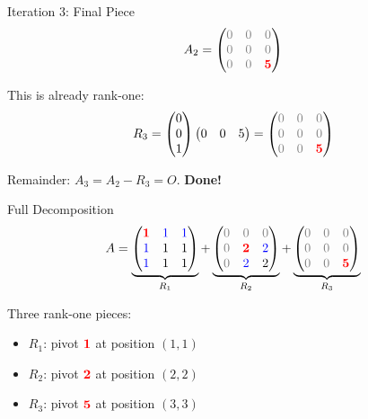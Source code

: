 \documentclass[10pt]{beamer}
\theoremstyle{definition}
\newcommand{\pvt}[1]{{\color{red}\mathbf{#1}}}       %
\newcommand{\crs}[1]{{\color{blue}#1}}                %
\newcommand{\rem}[1]{{\color{gray}#1}}                %
\newcommand{\x}[1]{\alert{\textbf{#1}}}
\begin{document}
\begin{frame}{Iteration 3: Final Piece}
$$A_2 = \begin{pmatrix}
\rem{0} & \rem{0} & \rem{0} \\
\rem{0} & \rem{0} & \rem{0} \\
\rem{0} & \rem{0} & \pvt{5}
\end{pmatrix}$$

\vfill
This is already rank-one:
$$R_3 = \begin{pmatrix} 0 \\ 0 \\ 1 \end{pmatrix}
\begin{pmatrix} 0 & 0 & 5 \end{pmatrix}
= \begin{pmatrix}
\rem{0} & \rem{0} & \rem{0} \\
\rem{0} & \rem{0} & \rem{0} \\
\rem{0} & \rem{0} & \pvt{5}
\end{pmatrix}$$

Remainder: $A_3 = A_2 - R_3 = O$. \quad \x{Done!}
\end{frame}

\begin{frame}{Full Decomposition}
$$A = \underbrace{\begin{pmatrix}
\pvt{1} & \crs{1} & \crs{1} \\
\crs{1} & 1 & 1 \\
\crs{1} & 1 & 1
\end{pmatrix}}_{R_1}
+ \underbrace{\begin{pmatrix}
\rem{0} & \rem{0} & \rem{0} \\
\rem{0} & \pvt{2} & \crs{2} \\
\rem{0} & \crs{2} & 2
\end{pmatrix}}_{R_2}
+ \underbrace{\begin{pmatrix}
\rem{0} & \rem{0} & \rem{0} \\
\rem{0} & \rem{0} & \rem{0} \\
\rem{0} & \rem{0} & \pvt{5}
\end{pmatrix}}_{R_3}$$

\vfill
Three rank-one pieces:
\begin{itemize}
\item $R_1$: pivot $\pvt{1}$ at position $(1,1)$
\item $R_2$: pivot $\pvt{2}$ at position $(2,2)$
\item $R_3$: pivot $\pvt{5}$ at position $(3,3)$
\end{itemize}
\end{frame}
\end{document}
